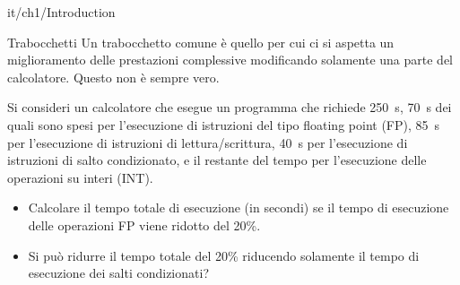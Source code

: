 \documentclass[11pt]{article}
\begin{document}
\begin{quiz}{it/ch1/Introduction}
\begin{cloze}[points=1,shuffle=true]{Trabocchetti}
Un trabocchetto comune è quello per cui ci si aspetta un miglioramento delle prestazioni complessive modificando solamente una parte del calcolatore. Questo non è sempre vero.

Si consideri un calcolatore che esegue un programma che richiede 250~s, 70~s dei quali sono spesi per l'esecuzione di istruzioni del tipo floating point (FP), 85~s per l'esecuzione di istruzioni di lettura/scrittura, 40~s per l'esecuzione di istruzioni di salto condizionato, e il restante del tempo per l'esecuzione delle operazioni su interi (INT).
\begin{itemize}
    \item Calcolare il tempo totale di esecuzione (in secondi) se il tempo di esecuzione delle operazioni FP viene ridotto del 20\%. 
    \item Si può ridurre il tempo totale del 20\% riducendo solamente il tempo di esecuzione dei salti condizionati?
\end{itemize}
\end{cloze}

\end{quiz}
\end{document}
